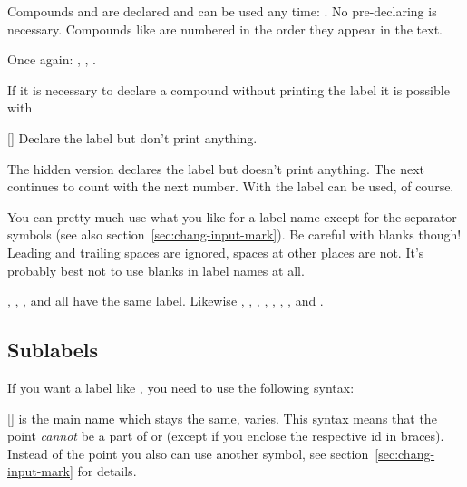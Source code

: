 \documentclass[load-preamble+,ngerman,british,american]{cnltx-doc}
\begin{document}
\begin{example}
  Compounds  and  are declared and can be used any time:
  .  No pre-declaring is necessary.  Compounds like  are
  numbered in the order they appear in the text.\par
  Once again: , , .
\end{example}

If it is necessary to declare a compound without printing the label it is
possible with
\begin{commands}
  [\sarg{}]
    Declare the label  but don't print anything.
\end{commands}

\begin{example}
  The hidden version declares the label but doesn't print anything.
  The next  continues to count with the next number.  With 
  the label can be used, of course.
\end{example}

You can pretty much use what you like for a label name except for the
separator symbols (see also section~\ref{sec:chang-input-mark}).  Be careful
with blanks though!  Leading and trailing spaces are ignored, spaces at other
places are not.  It's probably best not to use blanks in label names at all.

\begin{example}[add-sourcecode-options={showspaces=true}]
  , , , and  all have the same label.
  Likewise , , , , ,
  , , and .
\end{example}

\subsection{Sublabels}\label{sec:sublabel}
If you want a label like , you need to use the following syntax:
\begin{commands}
  []
     is the main name which stays the same,  varies.  This syntax means that the point 
    \emph{cannot} be a part of  or 
    (except if you enclose the respective \ac{id} in braces). Instead of the
    point you also can use another symbol, see
    section~\ref{sec:chang-input-mark} for details.
\end{commands}
\end{document}

